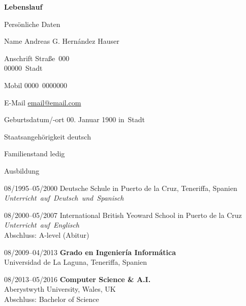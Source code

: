 \documentclass[12pt,a4paper,oneside,final]{scrartcl}
\begin{document}
\noindent\textbf{\Large{Lebenslauf}}

\vspace{1em}


\vspace{2em}

\begin{cv}

    \begin{cvlist}{Persönliche Daten}
        \setlength\itemsep{-0.5em}
        \item[Name] Andreas G. Hernández Hauser
        \item[Anschrift] Straße~000\\
            00000~Stadt
            \setlength\itemsep{0em}
        \item[Mobil] 0000~0000000
        \setlength\itemsep{-0.5em}
        \item[E-Mail] \href{mailto:email@email.com}{email@email.com}
        \setlength\itemsep{0em}
        \item[Geburtsdatum/-ort] 00. Januar 1900 in~Stadt
        \setlength\itemsep{-0.5em}
        \item[Staatsangehörigkeit] deutsch
        \item[Familienstand] ledig

        \sepspace
    \end{cvlist}

    \begin{cvlist}{Ausbildung}
        \item[08/1995--05/2000] Deutsche Schule in Puerto de la Cruz, Teneriffa, Spanien\\
            \textit{Unterricht~auf~Deutsch~und~Spanisch}
        \item[08/2000--05/2007] International British Yeoward School in Puerto de la Cruz\\
            \textit{Unterricht~auf~Englisch}\\
            Abschluss: A-level (Abitur)
        \item[08/2009--04/2013] \textbf{Grado en Ingeniería Informática}\\
            Universidad de La Laguna, Teneriffa, Spanien
        \item[08/2013--05/2016] \textbf{Computer Science \& A.I.}\\
            Aberystwyth University, Wales, UK\\
            Abschluss: Bachelor of Science


\end{cvlist}
\end{cv}
\end{document}

